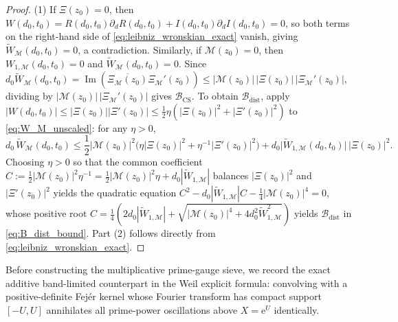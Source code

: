 \documentclass[11pt,reqno,a4paper]{amsart}
\theoremstyle{plain}
\theoremstyle{definition}
\theoremstyle{remark}
\numberwithin{equation}{section}
\newcommand{\ee}{\mathrm{e}}
\begin{document}
\begin{proof}
(1) If $\Xi(z_0) = 0$, then $W(d_0,t_0) = R(d_0,t_0)\partial_d R(d_0,t_0) + I(d_0,t_0)\partial_d I(d_0,t_0) = 0$, so both terms on the right-hand side of \eqref{eq:leibniz_wronskian_exact} vanish, giving $\widetilde{W}_{\mathcal{M}}(d_0,t_0) = 0$, a contradiction. Similarly, if $\mathcal{M}(z_0) = 0$, then $W_{1,\mathcal{M}}(d_0,t_0) = 0$ and $\widetilde{W}_{\mathcal{M}}(d_0,t_0) = 0$. Since $d_0\widetilde{W}_{\mathcal{M}}(d_0,t_0) = \operatorname{Im}(\overline{\Xi_{\mathcal{M}}(z_0)}\Xi_{\mathcal{M}}'(z_0)) \le |\mathcal{M}(z_0)|\,|\Xi(z_0)|\,|\Xi_{\mathcal{M}}'(z_0)|$, dividing by $|\mathcal{M}(z_0)|\,|\Xi_{\mathcal{M}}'(z_0)|$ gives $\mathcal{B}_{\mathrm{CS}}$. To obtain $\mathcal{B}_{\mathrm{dist}}$, apply $|W(d_0,t_0)| \le |\Xi(z_0)||\Xi'(z_0)| \le \frac{1}{2}\eta(|\Xi(z_0)|^2 + |\Xi'(z_0)|^2)$ to \eqref{eq:W_M_unscaled}: for any $\eta > 0$,
\begin{equation*}
  d_0\,\widetilde{W}_{\mathcal{M}}(d_0,t_0)
  \le \frac{1}{2}\big|\mathcal{M}(z_0)\big|^2\Big(\eta\big|\Xi(z_0)\big|^2 + \eta^{-1}\big|\Xi'(z_0)\big|^2\Big) + d_0\big|\widetilde{W}_{1,\mathcal{M}}(d_0,t_0)\big|\,\big|\Xi(z_0)\big|^2.
\end{equation*}
Choosing $\eta > 0$ so that the common coefficient $C := \frac{1}{2}|\mathcal{M}(z_0)|^2\eta^{-1} = \frac{1}{2}|\mathcal{M}(z_0)|^2\eta + d_0|\widetilde{W}_{1,\mathcal{M}}|$ balances $|\Xi(z_0)|^2$ and $|\Xi'(z_0)|^2$ yields the quadratic equation $C^2 - d_0|\widetilde{W}_{1,\mathcal{M}}|C - \frac{1}{4}|\mathcal{M}(z_0)|^4 = 0$, whose positive root $C = \frac{1}{4}(2d_0|\widetilde{W}_{1,\mathcal{M}}| + \sqrt{|\mathcal{M}(z_0)|^4 + 4d_0^2\widetilde{W}_{1,\mathcal{M}}^2})$ yields $\mathcal{B}_{\mathrm{dist}}$ in \eqref{eq:B_dist_bound}. Part (2) follows directly from \eqref{eq:leibniz_wronskian_exact}.
\end{proof}

Before constructing the multiplicative prime-gauge sieve, we record the exact additive band-limited counterpart in the Weil explicit formula: convolving with a positive-definite Fej\'er kernel whose Fourier transform has compact support $[-U, U]$ annihilates all prime-power oscillations above $X = \ee^U$ identically.
\end{document}
